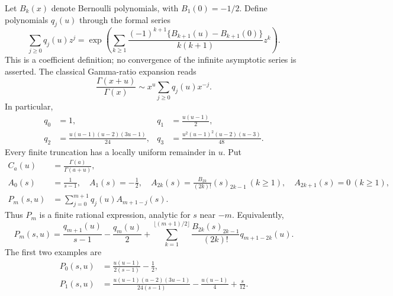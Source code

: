 \documentclass[11pt,a4paper]{article}
\theoremstyle{definition}
\theoremstyle{remark}
\numberwithin{equation}{section}
\begin{document}
Let $B_k(x)$ denote Bernoulli polynomials, with $B_1(0)=-1/2$.
Define polynomials $q_j(u)$ through the formal series
\begin{equation}\label{h2:eq:qgen}
 \sum_{j\ge0}q_j(u)z^j
 =\exp\left(\sum_{k\ge1}
       \frac{(-1)^{k+1}\{B_{k+1}(u)-B_{k+1}(0)\}}
            {k(k+1)}z^k\right).
\end{equation}
This is a coefficient definition; no convergence of the infinite
asymptotic series is asserted. The classical Gamma-ratio expansion
\cite{DLMFGamma} reads
\begin{equation}\label{h2:eq:ratio}
 \frac{\Gamma(x+u)}{\Gamma(x)}
   \sim x^u\sum_{j\ge0}q_j(u)x^{-j}.
\end{equation}
In particular,
\[
 \begin{aligned}
 q_0&=1,& q_1&=\frac{u(u-1)}2,\\
 q_2&=\frac{u(u-1)(u-2)(3u-1)}{24},&
 q_3&=\frac{u^2(u-1)^2(u-2)(u-3)}{48}.
 \end{aligned}
\]
Every finite truncation has a locally uniform remainder in $u$.
Put
\begin{align}
 C_a(u)&=\frac{\Gamma(a)}{\Gamma(a+u)},\label{h2:eq:C}\\
 A_0(s)&=\frac1{s-1},\quad A_1(s)=-\frac12,\quad
 A_{2k}(s)=\frac{B_{2k}}{(2k)!}(s)_{2k-1}\ (k\ge1),\quad
 A_{2k+1}(s)=0\ (k\ge1),\label{h2:eq:A}\\
 P_m(s,u)&=\sum_{j=0}^{m+1}q_j(u)A_{m+1-j}(s).
 \label{h2:eq:P}
\end{align}
Thus $P_m$ is a finite rational expression, analytic for $s$ near $-m$.
Equivalently,
\[
 P_m(s,u)=\frac{q_{m+1}(u)}{s-1}-\frac{q_m(u)}2
  +\sum_{k=1}^{\lfloor(m+1)/2\rfloor}
       \frac{B_{2k}(s)_{2k-1}}{(2k)!}q_{m+1-2k}(u).
\]
The first two examples are
\begin{align}
 P_0(s,u)&=\frac{u(u-1)}{2(s-1)}-\frac12,
 \label{h2:eq:P0}\\
 P_1(s,u)&=\frac{u(u-1)(u-2)(3u-1)}{24(s-1)}
             -\frac{u(u-1)}4+\frac{s}{12}.
 \label{h2:eq:P1}
\end{align}
\end{document}

